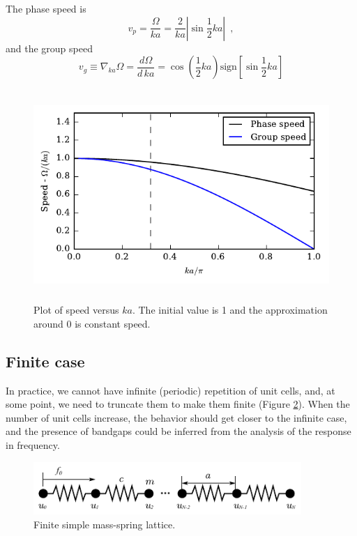 \documentclass[12pt]{article}
\begin{document}
The phase speed is
\[v_p = \frac{\Omega}{ka} = \frac{2}{ka}\left\vert \sin \frac{1}{2} ka\right\vert \enspace ,\]
and the group speed
\[v_g \equiv \nabla_{ka}\Omega = \frac{d\Omega}{d\, ka} = \cos \left(\frac{1}{2} ka\right) \text{sign}\left[\sin \frac{1}{2} ka\right] \]

\begin{figure}[h]
\centering
\includegraphics[height=8cm]{img/spring-mass-speeds.pdf} 
\caption{Plot of speed versus $ka$. The initial value is 1 and the approximation around 0 is constant speed.}
\label{fig:spring-mass-speed}
\end{figure}



\subsection{Finite case}
In practice, we cannot have infinite (periodic) repetition of unit cells, and, at some point, we need to truncate them to make them finite (Figure \ref{fig:spring-mass-finite}). When the number of unit cells increase, the behavior should get closer to the infinite case, and the presence of bandgaps could be inferred from the analysis of the response in frequency.
\begin{figure}[H]
\centering
\includegraphics[width=4in]{img/spring-mass-finite.pdf} 
\caption{Finite simple mass-spring lattice.}\label{fig:spring-mass-finite}
\end{figure}
\end{document}
